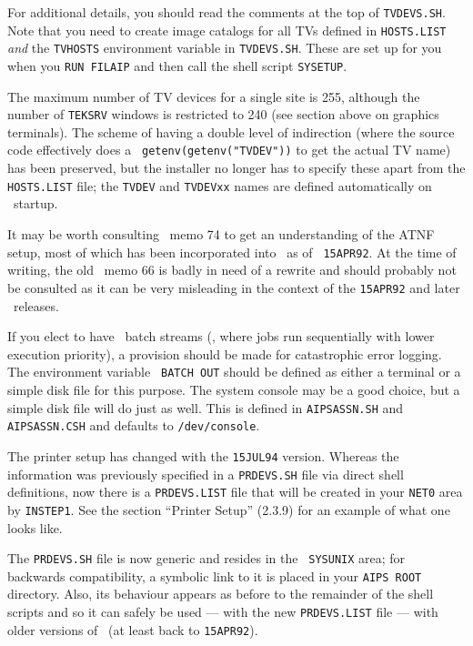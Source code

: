 \noindent For additional details, you should read the comments at the
top of {\tt TVDEVS.SH}.  Note that you need to create image catalogs for
all TVs defined in {\tt HOSTS.LIST} {\it and\/} the {\tt TVHOSTS}
environment variable in {\tt TVDEVS.SH}.  These are set up for you when
you {\tt RUN FILAIP} and then call the shell script {\tt SYSETUP}.

The maximum number of TV devices for a single \AIPS site is 255,
although the number of {\tt TEKSRV} windows is restricted to 240 (see
section above on graphics terminals).  The scheme of having a double
level of indirection (where the source code effectively does a {\tt
getenv(getenv("TVDEV"))} to get the actual TV name) has been preserved,
but the installer no longer has to specify these apart from the {\tt
HOSTS.LIST} file; the {\tt TVDEV} and {\tt TVDEVxx} names are defined
automatically on \AIPS\ startup.

It may be worth consulting \AIPS\ memo 74 to get an understanding of the
ATNF setup, most of which has been incorporated into \AIPS\ as of {\tt
15APR92}.  At the time of writing, the old \AIPS\ memo 66 is badly in
need of a rewrite and should probably not be consulted as it can be very
misleading in the context of the {\tt 15APR92} and later
\AIPS\ releases. \medskip


If you elect to have \AIPS\ batch streams (\ie, where jobs run
sequentially with lower execution priority), a provision should be made
for catastrophic error logging.  The environment variable {\tt
BATCH OUT} should be defined as either a terminal or a simple disk file
for this purpose.  The system console may be a good choice, but a simple
disk file will do just as well.  This is defined in {\tt AIPSASSN.SH}
and {\tt AIPSASSN.CSH} and defaults to {\tt /dev/console}.
\medskip


The printer setup has changed with the {\tt 15JUL94} version.  Whereas the
information was previously specified in a {\tt PRDEVS.SH} file via direct
shell definitions, now there is a {\tt PRDEVS.LIST} file that will be
created in your {\tt\dol NET0} area by {\tt INSTEP1}.  See the section
``Printer Setup'' (2.3.9)
for an example of what one looks like.

The {\tt PRDEVS.SH} file is now generic and resides in the {\tt \dol
SYSUNIX} area; for backwards compatibility, a symbolic link to it is
placed in your {\tt\dol AIPS ROOT} directory.  Also, its behaviour
appears as before to the remainder of the shell scripts and so it can
safely be used --- with the new {\tt PRDEVS.LIST} file --- with older
versions of \AIPS\ (at least back to {\tt 15APR92}).

